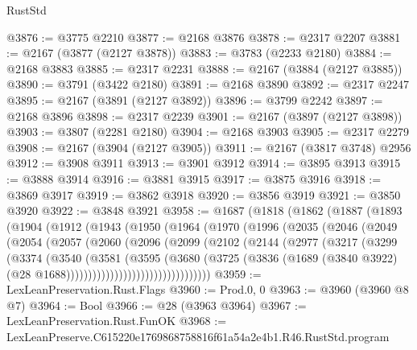 \begin{lexlean}{RustStd}
\begin{coremodule}
@3876 := @3775 @2210
@3877 := @2168 @3876
@3878 := @2317 @2207
@3881 := @2167 (@3877 (@2127 @3878))
@3883 := @3783 (@2233 @2180)
@3884 := @2168 @3883
@3885 := @2317 @2231
@3888 := @2167 (@3884 (@2127 @3885))
@3890 := @3791 (@3422 @2180)
@3891 := @2168 @3890
@3892 := @2317 @2247
@3895 := @2167 (@3891 (@2127 @3892))
@3896 := @3799 @2242
@3897 := @2168 @3896
@3898 := @2317 @2239
@3901 := @2167 (@3897 (@2127 @3898))
@3903 := @3807 (@2281 @2180)
@3904 := @2168 @3903
@3905 := @2317 @2279
@3908 := @2167 (@3904 (@2127 @3905))
@3911 := @2167 (@3817 @3748) @2956
@3912 := @3908 @3911
@3913 := @3901 @3912
@3914 := @3895 @3913
@3915 := @3888 @3914
@3916 := @3881 @3915
@3917 := @3875 @3916
@3918 := @3869 @3917
@3919 := @3862 @3918
@3920 := @3856 @3919
@3921 := @3850 @3920
@3922 := @3848 @3921
@3958 := @1687
    (@1818
      (@1862
        (@1887
          (@1893
            (@1904
              (@1912
                (@1943
                  (@1950
                    (@1964
                      (@1970
                        (@1996
                          (@2035
                            (@2046
                              (@2049
                                (@2054
                                  (@2057
                                    (@2060
                                      (@2096
                                        (@2099
                                          (@2102
                                            (@2144
                                              (@2977
                                                (@3217
                                                  (@3299
                                                    (@3374
                                                      (@3540
                                                        (@3581
                                                          (@3595
                                                            (@3680
                                                              (@3725
                                                                (@3836
                                                                  (@1689
                                                                    (@3840 @3922)
                                                                    (@28
                                                                      @1688)))))))))))))))))))))))))))))))))
@3959 := LexLeanPreservation.Rust.Flags
@3960 := Prod.{0, 0}
@3963 := @3960 (@3960 @8 @7)
@3964 := Bool
@3966 := @28 (@3963 @3964)
@3967 := LexLeanPreservation.Rust.FunOK
@3968 := LexLeanPreserve.C615220e1769868758816f61a54a2e4b1.R46.RustStd.program

\end{coremodule}
\end{lexlean}
